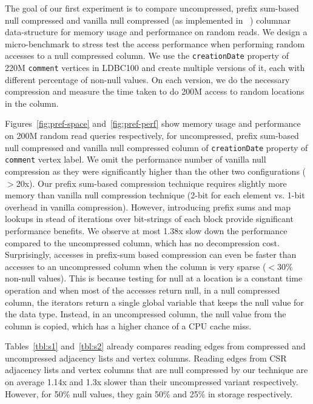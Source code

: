 The goal of our first experiment is to compare uncompressed, prefix sum-based null compressed and vanilla null compressed (as implemented in ~\cite{abadi-sparse-col}) columnar data-structure for memory usage and performance on random reads. We design a micro-benchmark to stress test the access performance when performing random accesses to a null compressed column. We use the \texttt{creationDate} property of 220M \texttt{comment} vertices in LDBC100 and create multiple versions of it, each with different percentage of non-null values. On each version, we do the necessary compression and measure the time taken to do 200M access to random locations in the column. 

Figures~\ref{fig:pref-space} and~\ref{fig:pref-perf} show memory usage and performance on 200M random read queries respectively, for uncompressed, prefix sum-based null compressed and vanilla null compressed column of \texttt{creationDate} property of \texttt{comment} vertex label. We omit the performance number of vanilla null compression as they were significantly higher than the other two configurations ($>$20x). Our prefix sum-based  compression technique requires slightly more memory than vanilla null compression technique (2-bit for each element vs. 1-bit overhead in vanilla compression). However, introducing prefix sums and map lookups in stead of iterations over bit-strings of each block provide significant performance benefits. We observe at most 1.38x slow down the performance compared to the uncompressed column, which has no decompression cost. Surprisingly, accesses in prefix-sum based compression can even be faster than accesses to an uncompressed column when the column is very sparse ($<30\%$ non-null values). This is because testing for null at a location is a constant time operation and when most of the accesses return null, in a null compressed column, the iterators return a single global variable that keeps  the null value for the data type. Instead, in an uncompressed column, the null value from the column is copied, which has a higher chance of a CPU cache miss. 


Tables~\ref{tbl:s1} and~\ref{tbl:s2} already compares reading edges from compressed and uncompressed adjacency lists and vertex columns. Reading edges from CSR adjacency lists and vertex columns that are null compressed by our technique are on average 1.14x and 1.3x slower than their uncompressed variant respectively. However, for 50\% null values, they gain 50\% and 25\% in storage respectively. 

